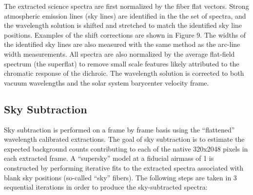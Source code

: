 \documentclass[12pt,preprint]{aastex}
\begin{document}
The extracted science spectra are first normalized by the fiber flat vectors.
Strong atmospheric emission lines (sky lines) are identified in the the 
set of spectra, and the wavelength solution is shifted and stretched 
to match the identified sky line positions.  
Examples of the shift corrections are shown in Figure 9.  
The widths of the identified sky lines are also measured with the same method
as the arc-line width measurements.  All spectra are also normalized by
the average flat-field spectrum (the superflat) to remove small scale
features likely attributed to the chromatic response of the dichroic.
The wavelength solution is corrected to both vacuum wavelengths and the
solar system barycenter velocity frame.

\subsection{Sky Subtraction}

Sky subtraction is performed on a frame by frame basis using the 
``flattened'' wavelength calibrated extractions.  The goal of sky subtraction
is to estimate the expected background counts contributing to each of 
the native 320x2048 pixels in each extracted frame.  A ``supersky'' model 
at a fiducial airmass of 1 is constructed by performing iterative fits to
the extracted spectra associated with blank sky positions (so-called
``sky'' fibers).   The following steps are taken in 3 sequential iterations
in order to produce the sky-subtracted spectra:
\end{document}
